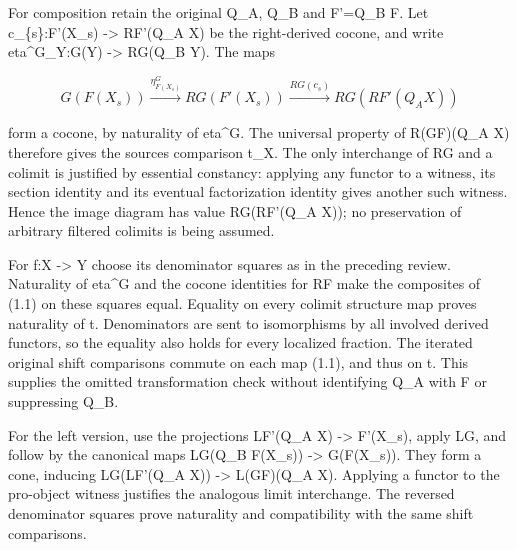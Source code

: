 \documentclass[11pt]{article}
\begin{document}
For composition retain the original Q\_\allowbreak{}A,\allowbreak{} Q\_\allowbreak{}B and F'\allowbreak{}=Q\_\allowbreak{}B F. Let c\_\allowbreak{}\{s\}:\allowbreak{}F'(X\_\allowbreak{}s)\allowbreak{} \allowbreak{}-> RF'(Q\_\allowbreak{}A X)\allowbreak{} be the right-derived cocone,\allowbreak{} and write eta\textasciicircum{}G\_\allowbreak{}Y:\allowbreak{}G(Y)\allowbreak{} \allowbreak{}-> RG(Q\_\allowbreak{}B Y)\allowbreak{}. The maps

\[
 G(F(X_s))\xrightarrow{\eta^G_{F(X_s)}}RG(F'(X_s))
        \xrightarrow{RG(c_s)}RG(RF'(Q_A X))                 \tag{1.1}
\]

form a cocone,\allowbreak{} by naturality of eta\^{}G. The universal property of R(GF)\allowbreak{}(Q\_\allowbreak{}A X)\allowbreak{} therefore gives the source\textquotesingle s comparison t\_\allowbreak{}X. The only interchange of RG and a colimit is justified by essential constancy:\allowbreak{} applying any functor to a witness,\allowbreak{} its section identity and its eventual factorization identity gives another such witness. Hence the image diagram has value RG(RF'(Q\_\allowbreak{}A X)\allowbreak{})\allowbreak{}; no preservation of arbitrary filtered colimits is being assumed.

For f:\allowbreak{}X \allowbreak{}-> Y choose its denominator squares as in the preceding review. Naturality of eta\^{}G and the cocone identities for RF\textquotesingle{} make the composites of (1.1)\allowbreak{} on these squares equal. Equality on every colimit structure map proves naturality of t. Denominators are sent to isomorphisms by all involved derived functors,\allowbreak{} so the equality also holds for every localized fraction. The iterated original shift comparisons commute on each map (1.1)\allowbreak{},\allowbreak{} and thus on t. This supplies the omitted transformation check without identifying Q\_\allowbreak{}A with F or suppressing Q\_\allowbreak{}B.

For the left version,\allowbreak{} use the projections LF'(Q\_\allowbreak{}A X)\allowbreak{} \allowbreak{}-> F'(X\_\allowbreak{}s)\allowbreak{},\allowbreak{} apply LG,\allowbreak{} and follow by the canonical maps LG(Q\_\allowbreak{}B F(X\_\allowbreak{}s)\allowbreak{})\allowbreak{} \allowbreak{}-> G(F(X\_\allowbreak{}s)\allowbreak{})\allowbreak{}. They form a cone,\allowbreak{} inducing LG(LF'(Q\_\allowbreak{}A X)\allowbreak{})\allowbreak{} \allowbreak{}-> L(GF)\allowbreak{}(Q\_\allowbreak{}A X)\allowbreak{}. Applying a functor to the pro-object witness justifies the analogous limit interchange. The reversed denominator squares prove naturality and compatibility with the same shift comparisons.
\end{document}
